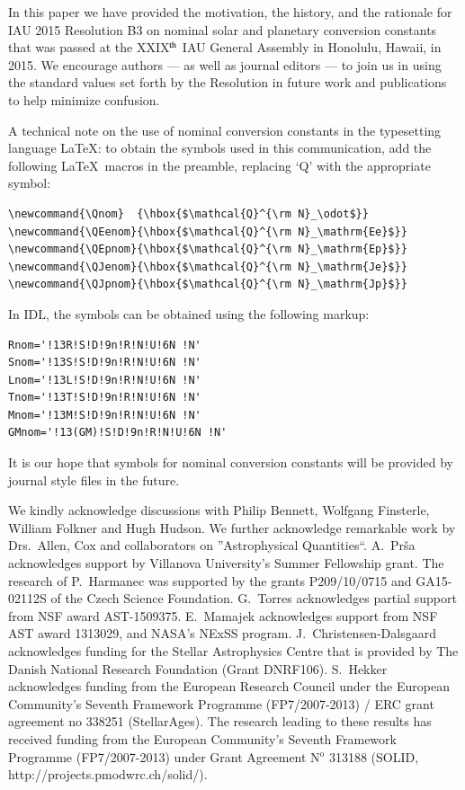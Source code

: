 \documentclass[preprint]{aastex}
\newcommand{\rev}[1]{{#1}}
\begin{document}
In this paper we have provided the motivation, the \rev{history}, and the rationale for IAU 2015 Resolution B3 on nominal solar and planetary conversion constants that was passed at the XXIX$^{\rm th}$ IAU General Assembly in Honolulu, Hawaii, in 2015. We encourage authors --- as well as journal editors --- to join us in using the standard values set forth by the Resolution in future work and publications to help minimize confusion.

\bigskip

\noindent
A technical note on the use of nominal conversion constants in the typesetting language \LaTeX{}: to obtain the symbols used in this communication, add the following \LaTeX~macros in the preamble, replacing `Q' with the appropriate symbol:
%
\begin{verbatim}
\newcommand{\Qnom}  {\hbox{$\mathcal{Q}^{\rm N}_\odot$}}
\newcommand{\QEenom}{\hbox{$\mathcal{Q}^{\rm N}_\mathrm{Ee}$}}
\newcommand{\QEpnom}{\hbox{$\mathcal{Q}^{\rm N}_\mathrm{Ep}$}}
\newcommand{\QJenom}{\hbox{$\mathcal{Q}^{\rm N}_\mathrm{Je}$}}
\newcommand{\QJpnom}{\hbox{$\mathcal{Q}^{\rm N}_\mathrm{Jp}$}}
\end{verbatim}
%
In IDL, the symbols can be obtained using the following markup:
%
\begin{verbatim}
Rnom='!13R!S!D!9n!R!N!U!6N !N'
Snom='!13S!S!D!9n!R!N!U!6N !N'
Lnom='!13L!S!D!9n!R!N!U!6N !N'
Tnom='!13T!S!D!9n!R!N!U!6N !N'
Mnom='!13M!S!D!9n!R!N!U!6N !N'
GMnom='!13(GM)!S!D!9n!R!N!U!6N !N'
\end{verbatim}
%
It is our hope that symbols for nominal conversion constants will be provided by journal style files in the future.

\begin{acknowledgements}
We kindly acknowledge discussions with Philip Bennett, Wolfgang Finsterle, William Folkner \rev{and} Hugh Hudson. We further acknowledge remarkable work by Drs.~Allen, Cox and collaborators on ''Astrophysical Quantities``. A.\ Pr\v sa acknowledges support by Villanova University's Summer Fellowship grant. The research of P.~Harmanec was supported by the grants P209/10/0715 and GA15-02112S of the Czech Science Foundation. G.\ Torres acknowledges partial support from NSF award AST-1509375. E.\ Mamajek acknowledges support from NSF AST award 1313029, and NASA's NExSS program. J.\ Christensen-Dalsgaard acknowledges funding for the Stellar Astrophysics Centre that is provided by The Danish National Research Foundation (Grant DNRF106). S.\ Hekker acknowledges funding from the European Research Council under the European Community's Seventh Framework Programme (FP7/2007-2013) / ERC grant agreement no 338251 (StellarAges). The research leading to these results has received funding from the European Community’s Seventh Framework Programme (FP7/2007-2013) under Grant Agreement N${}^\mathrm{o}$ 313188 (SOLID, http://projects.pmodwrc.ch/solid/).
\end{acknowledgements}
\end{document}
